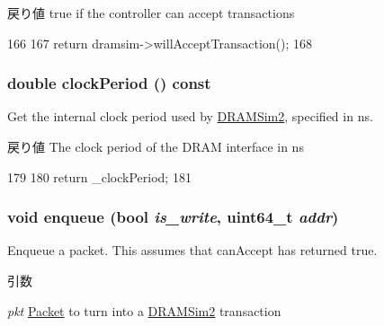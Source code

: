 \begin{DoxyReturn}{戻り値}
true if the controller can accept transactions 
\end{DoxyReturn}



\begin{DoxyCode}
166 {
167     return dramsim->willAcceptTransaction();
168 }
\end{DoxyCode}
\hypertarget{classDRAMSim2Wrapper_a6efe80b239837bd53bf8d8694c665993}{
\subsubsection[{clockPeriod}]{\setlength{\rightskip}{0pt plus 5cm}double clockPeriod () const}}
\label{classDRAMSim2Wrapper_a6efe80b239837bd53bf8d8694c665993}
Get the internal clock period used by \hyperlink{classDRAMSim2}{DRAMSim2}, specified in ns.

\begin{DoxyReturn}{戻り値}
The clock period of the DRAM interface in ns 
\end{DoxyReturn}



\begin{DoxyCode}
179 {
180     return _clockPeriod;
181 }
\end{DoxyCode}
\hypertarget{classDRAMSim2Wrapper_ae247cb4ece9657b8730c721920c23ab7}{
\subsubsection[{enqueue}]{\setlength{\rightskip}{0pt plus 5cm}void enqueue (bool {\em is\_\-write}, \/  uint64\_\-t {\em addr})}}
\label{classDRAMSim2Wrapper_ae247cb4ece9657b8730c721920c23ab7}
Enqueue a packet. This assumes that canAccept has returned true.


\begin{DoxyParams}{引数}
\item[{\em pkt}]\hyperlink{classPacket}{Packet} to turn into a \hyperlink{classDRAMSim2}{DRAMSim2} transaction \end{DoxyParams}



